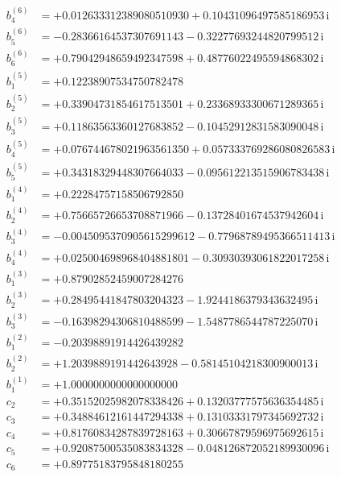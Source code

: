 {\begin{align*}
b^{(6)}_{4} &= +0.012633312389080510930 + 0.10431096497585186953\,\mathrm{i}\\
b^{(6)}_{5} &= -0.28366164537307691143 - 0.32277693244820799512\,\mathrm{i}\\
b^{(6)}_{6} &= +0.79042948659492347598 + 0.48776022495594868302\,\mathrm{i}\\[1mm]
b^{(5)}_{1} &= +0.12238907534750782478\\
b^{(5)}_{2} &= +0.33904731854617513501 + 0.23368933300671289365\,\mathrm{i}\\
b^{(5)}_{3} &= +0.11863563360127683852 - 0.10452912831583090048\,\mathrm{i}\\
b^{(5)}_{4} &= +0.076744678021963561350 + 0.057333769286080826583\,\mathrm{i}\\
b^{(5)}_{5} &= +0.34318329448307664033 - 0.095612213515906783438\,\mathrm{i}\\[1mm]
b^{(4)}_{1} &= +0.22284757158506792850\\
b^{(4)}_{2} &= +0.75665726653708871966 - 0.13728401674537942604\,\mathrm{i}\\
b^{(4)}_{3} &= -0.0045095370905615299612 - 0.77968789495366511413\,\mathrm{i}\\
b^{(4)}_{4} &= +0.025004698968404881801 - 0.30930393061822017258\,\mathrm{i}\\[1mm]
b^{(3)}_{1} &= +0.87902852459007284276\\
b^{(3)}_{2} &= +0.28495441847803204323 - 1.9244186379343632495\,\mathrm{i}\\
b^{(3)}_{3} &= -0.16398294306810488599 - 1.5487786544787225070\,\mathrm{i}\\[1mm]
b^{(2)}_{1} &= -0.20398891914426439282\\
b^{(2)}_{2} &= +1.2039889191442643928 - 0.58145104218300900013\,\mathrm{i}\\[1mm]
b^{(1)}_{1} &= +1.0000000000000000000\\[1mm]
c_{2} &= +0.35152025982078338426 + 0.13203777575636354485\,\mathrm{i}\\
c_{3} &= +0.34884612161447294338 + 0.13103331797345692732\,\mathrm{i}\\
c_{4} &= +0.81760834287839728163 + 0.30667879596975692615\,\mathrm{i}\\
c_{5} &= +0.92087500535083834328 - 0.048126872052189930096\,\mathrm{i}\\
c_{6} &= +0.89775183795848180255
\end{align*}
}


